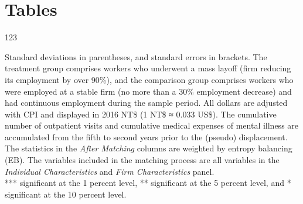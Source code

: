
\section*{Tables}


\begin{table}[H]
    \caption{123}
    \center
    
\end{table}
\vspace{-2em}
\begin{singlespace}
    \begin{footnotesize}
     Standard deviations in parentheses, and standard errors in brackets. The treatment group comprises workers who underwent a mass layoff (firm reducing its employment by over 90\%), and the comparison group comprises workers who were employed at a stable firm (no more than a 30\% employment decrease) and had continuous employment during the sample period. All dollars are adjusted with CPI and displayed in 2016 NT\$ (1 NT\$ ≈ 0.033 US\$). The cumulative number of outpatient visits and cumulative medical expenses of mental illness are accumulated from the fifth to second years prior to the (pseudo) displacement. The statistics in the {\it After Matching} columns are weighted by entropy balancing (EB). The variables included in the matching process are all variables in the {\it Individual Characteristics} and {\it Firm Characteristics} panel. \\
    *** significant at the 1 percent level, ** significant at the 5 percent level, and * significant at the 10 percent level.
    \end{footnotesize}
\end{singlespace}

